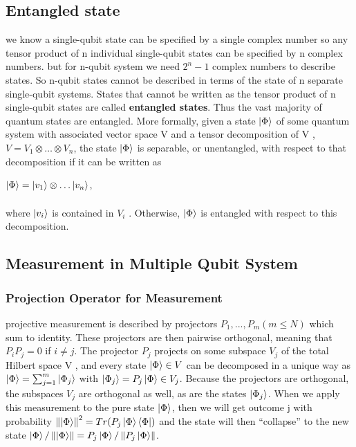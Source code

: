 \documentclass[11 pt]{article}
\theoremstyle{definition}
\theoremstyle{remark}
\newcommand\norm[1]{\left\lVert#1\right\rVert}
\newcommand{\tens}[1]{
  \mathbin{\mathop{\otimes}\limits_{#1}}}
\begin{document}
\subsection{Entangled state}
we know a single-qubit state can be specified by a single complex number so any tensor product of n individual single-qubit states can be specified by n complex numbers. but for n-qubit system we need $2^n - 1$ complex numbers to describe states. So n-qubit states cannot be described in terms of the state of n separate single-qubit systems. States that cannot be written as the tensor product of n single-qubit states are called \textbf{entangled states}. Thus the vast majority of quantum states are entangled.  More formally, given a state $\ket{\Phi}$ of some quantum system with associated vector space V and a tensor decomposition of V , $V = V_1 \tens{} \hdots \tens{} V_n$, the state $\ket{\Phi}$ is separable, or unentangled, with respect to that decomposition if it can be written as
\begin{center}
$\ket{\Phi} = \ket{v_1} \tens{} \hdots \ket{v_n}$,
\end{center}
where $\ket{v_i}$ is contained in $V_i$ . Otherwise, $\ket{\Phi}$ is entangled with respect to this decomposition.

\subsection{Measurement in Multiple Qubit System}
\subsubsection{Projection Operator for Measurement}
projective measurement is described by projectors $P_1, . . . , P_m (m ≤ N)$
which sum to identity. These projectors are then pairwise orthogonal, meaning that $P_iP_j = 0$ if
$i \neq j$.
The projector $P_j$ projects on some subspace $V_j$ of the total Hilbert space V , and every state
$\ket{\Phi} \in V$ can be decomposed in a unique way as $\ket{\Phi}= \sum_{j=1}^{m}\ket{\Phi_j}
 $ with $\ket{\Phi_j} = P_j\ket{\Phi} \in V_j$. Because the
projectors are orthogonal, the subspaces $V_j$ are orthogonal as well, as are the states $\ket{\Phi_j}$. When we
apply this measurement to the pure state $\ket{\Phi}$, then we will get outcome j with probability $\norm{\ket{\Phi}}^2 = Tr(P_j\ket{\Phi}\bra{\Phi}) $ and the state will then “collapse” to the new state $\ket{\Phi}/\norm{\ket{\Phi}}=P_j\ket{\Phi}/\norm{P_j\ket{\Phi}}$.
\end{document}
